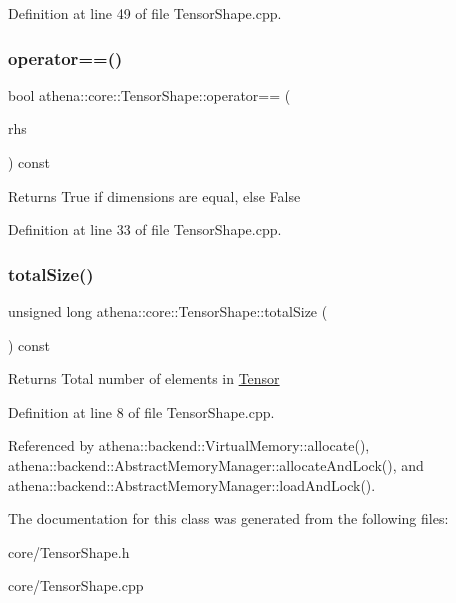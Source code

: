 Definition at line 49 of file Tensor\+Shape.\+cpp.

\mbox{\label{classathena_1_1core_1_1_tensor_shape_aa42737e3e51e76507bb60791889d4d9b}} 
\subsubsection{\texorpdfstring{operator==()}{operator==()}}
{\footnotesize\ttfamily bool athena\+::core\+::\+Tensor\+Shape\+::operator== (\begin{DoxyParamCaption}\item[{const \mbox{\hyperlink{classathena_1_1core_1_1_tensor_shape}{Tensor\+Shape}} \&}]{rhs }\end{DoxyParamCaption}) const}

\begin{DoxyReturn}{Returns}
True if dimensions are equal, else False 
\end{DoxyReturn}


Definition at line 33 of file Tensor\+Shape.\+cpp.

\mbox{\label{classathena_1_1core_1_1_tensor_shape_a81219fb0b0e3e6852cb02fbbcf059882}} 
\subsubsection{\texorpdfstring{total\+Size()}{totalSize()}}
{\footnotesize\ttfamily unsigned long athena\+::core\+::\+Tensor\+Shape\+::total\+Size (\begin{DoxyParamCaption}{ }\end{DoxyParamCaption}) const}

\begin{DoxyReturn}{Returns}
Total number of elements in \mbox{\hyperlink{classathena_1_1core_1_1_tensor}{Tensor}} 
\end{DoxyReturn}


Definition at line 8 of file Tensor\+Shape.\+cpp.



Referenced by athena\+::backend\+::\+Virtual\+Memory\+::allocate(), athena\+::backend\+::\+Abstract\+Memory\+Manager\+::allocate\+And\+Lock(), and athena\+::backend\+::\+Abstract\+Memory\+Manager\+::load\+And\+Lock().



The documentation for this class was generated from the following files\+:\begin{DoxyCompactItemize}
\item 
core/Tensor\+Shape.\+h\item 
core/Tensor\+Shape.\+cpp\end{DoxyCompactItemize}
